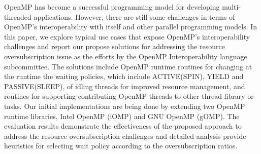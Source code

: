 OpenMP has become a successful programming model
for developing multi-threaded applications.
However, there are still some challenges in terms of OpenMP's interoperability
with itself and other parallel programming models.
In this paper, we explore typical use cases that expose OpenMP's interoperability challenges and
report our propose solutions for addressing the resource oversubscription issue as the efforts
by the OpenMP Interoperability language subcommittee. 
The solutions include OpenMP runtime routines for
changing at the runtime the waiting policies, which include ACTIVE(SPIN), YIELD and PASSIVE(SLEEP), 
of idling threads for improved resource management, and 
routines for supporting contributing OpenMP threads to other thread library or tasks. 
Our initial implementations are being done by extending two OpenMP runtime libraries, 
Intel OpenMP (iOMP) and GNU OpenMP (gOMP).
The evaluation results demonstrate the effectiveness of the proposed approach to address the resource 
oversubscription challenges and detailed analysis provide heuristics for selecting wait policy according
to the oversubscription ratios. 


